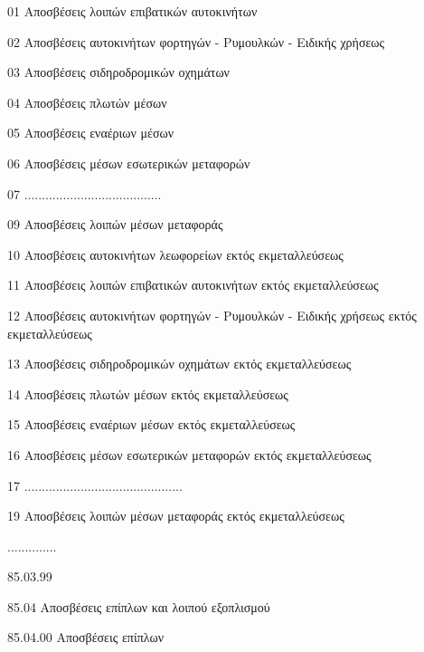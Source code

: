 \documentclass[A4,10pt,greek]{book}
\begin{document}
                               01    Αποσβέσεις λοιπών επιβατικών αυτοκινήτων

                               02    Αποσβέσεις αυτοκινήτων φορτηγών - Ρυμουλκών - Ειδικής
                                       χρήσεως

                               03    Αποσβέσεις σιδηροδρομικών οχημάτων

                               04    Αποσβέσεις πλωτών μέσων

                               05    Αποσβέσεις εναέριων μέσων

                               06    Αποσβέσεις μέσων εσωτερικών μεταφορών

                               07    .......................................

                               09    Αποσβέσεις λοιπών μέσων μεταφοράς

                               10    Αποσβέσεις αυτοκινήτων λεωφορείων εκτός εκμεταλλεύσεως

                               11    Αποσβέσεις λοιπών επιβατικών αυτοκινήτων εκτός
                                       εκμεταλλεύσεως

                               12    Αποσβέσεις αυτοκινήτων φορτηγών - Ρυμουλκών - Ειδικής
                                       χρήσεως εκτός εκμεταλλεύσεως

                               13    Αποσβέσεις σιδηροδρομικών οχημάτων εκτός εκμεταλλεύσεως

                               14    Αποσβέσεις πλωτών μέσων εκτός εκμεταλλεύσεως

                               15    Αποσβέσεις εναέριων μέσων εκτός εκμεταλλεύσεως

                               16    Αποσβέσεις μέσων εσωτερικών μεταφορών εκτός
                                       εκμεταλλεύσεως

                               17    .............................................

                               19    Αποσβέσεις λοιπών μέσων μεταφοράς εκτός εκμεταλλεύσεως

                    ..............

                    85.03.99

        85.04    Αποσβέσεις επίπλων και λοιπού εξοπλισμού

                    85.04.00    Αποσβέσεις επίπλων
\end{document}
